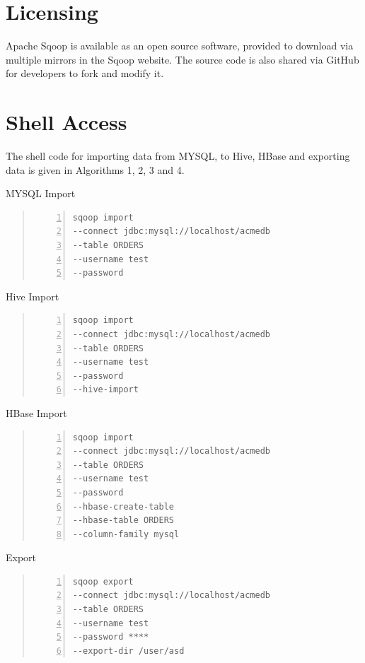 \documentclass[9pt,twocolumn,twoside]{styles/osajnl}
\begin{document}
\section{Licensing}
Apache Sqoop is available as an open source software, provided to download via multiple mirrors in the Sqoop website\cite{down}. The source code is also shared via GitHub \cite{git} for developers to fork and modify it. 

\section{Shell Access}
The shell code for importing data from MYSQL, to Hive, HBase and exporting data is given in Algorithms 1, 2, 3 and 4\cite{cloudera}.

\begin{algorithm}
\caption{MYSQL Import}\label{alg:mysql}
\begin{quote}
\begin{Verbatim}[numbers=left]
sqoop import 
--connect jdbc:mysql://localhost/acmedb 
--table ORDERS 
--username test 
--password 
\end{Verbatim}
\end{quote}
\end{algorithm}
\begin{algorithm}
\caption{Hive Import}\label{alg:hive}
\begin{quote}
\begin{Verbatim}[numbers=left]
sqoop import 
--connect jdbc:mysql://localhost/acmedb 
--table ORDERS 
--username test 
--password
--hive-import
\end{Verbatim}
\end{quote}
\end{algorithm}
\begin{algorithm}
\caption{HBase Import}\label{alg:hbase}
\begin{quote}
\begin{Verbatim}[numbers=left]
sqoop import 
--connect jdbc:mysql://localhost/acmedb
--table ORDERS 
--username test 
--password 
--hbase-create-table 
--hbase-table ORDERS 
--column-family mysql
\end{Verbatim}
\end{quote}
\end{algorithm}

\begin{algorithm}
\caption{Export}\label{alg:export}
\begin{quote}
\begin{Verbatim}[numbers=left]
sqoop export
--connect jdbc:mysql://localhost/acmedb
--table ORDERS 
--username test 
--password **** 
--export-dir /user/asd
\end{Verbatim}
\end{quote}
\end{algorithm}
\end{document}
